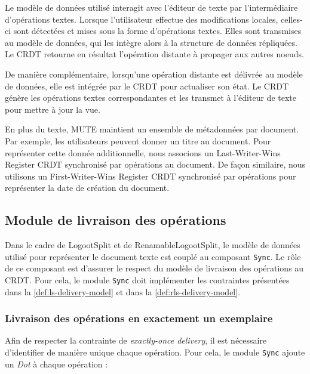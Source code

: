 \documentclass[12pt]{thesul}
\begin{document}
Le modèle de données utilisé interagit avec l'éditeur de texte par l'intermédiaire d'opérations textes.
Lorsque l'utilisateur effectue des modifications locales, celles-ci sont détectées et mises sous la forme d'opérations textes.
Elles sont transmises au modèle de données, qui les intègre alors à la structure de données répliquées.
Le \ac{CRDT} retourne en résultat l'opération distante à propager aux autres noeuds.

De manière complémentaire, lorsqu'une opération distante est délivrée au modèle de données, elle est intégrée par le \ac{CRDT} pour actualiser son état.
Le \ac{CRDT} génère les opérations textes correspondantes et les transmet à l'éditeur de texte pour mettre à jour la vue.

En plus du texte, MUTE maintient un ensemble de métadonnées par document.
Par exemple, les utilisateurs peuvent donner un titre au document.
Pour représenter cette donnée additionnelle, nous associons un Last-Writer-Wins Register \ac{CRDT} synchronisé par opérations\cite{shapiro_2011_crdt} au document.
De façon similaire, nous utilisons un First-Writer-Wins Register \ac{CRDT} synchronisé par opérations pour représenter la date de création du document.

\subsection{Module de livraison des opérations}

Dans le cadre de LogootSplit et de RenamableLogootSplit, le modèle de données utilisé pour représenter le document texte est couplé au composant \texttt{Sync}.
Le rôle de ce composant est d'assurer le respect du modèle de livraison des opérations au \ac{CRDT}.
Pour cela, le module \texttt{Sync} doit implémenter les contraintes présentées dans la \autoref{def:ls-delivery-model} et dans la \autoref{def:rls-delivery-model}.

\subsubsection{Livraison des opérations en exactement un exemplaire}

\label{sec:mute-exactly-once-delivery}

Afin de respecter la contrainte de \emph{exactly-once delivery}, il est nécessaire d'identifier de manière unique chaque opération.
Pour cela, le module \texttt{Sync} ajoute un \emph{Dot}\cite{2014-scalable-accurate-causality-tracking} à chaque opération :
\end{document}
